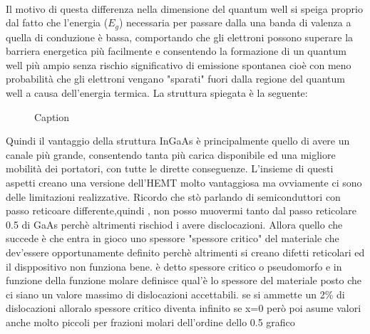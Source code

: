 \\%
Il motivo di questa differenza nella dimensione del quantum well si speiga proprio dal fatto che l'energia ($E_g$) necessaria per passare dalla una banda di valenza a quella di conduzione è bassa, comportando che gli elettroni possono superare la barriera energetica più facilmente e consentendo la formazione di un quantum well più ampio senza rischio significativo di emissione spontanea cioè con meno probabilità che gli elettroni vengano "sparati" fuori dalla regione del quantum well a causa dell'energia termica.
La struttura spiegata è la seguente:

\begin{figure}[hbt!]
    \centering
    \caption{Caption}%
    \label{fig:enter-label}
\end{figure}

Quindi il vantaggio della struttura InGaAs è principalmente quello di avere un canale più grande, consentendo tanta più carica disponibile ed una migliore mobilità dei portatori, con tutte le dirette conseguenze.
L'insieme di questi aspetti creano una versione dell'HEMT molto vantaggiosa ma ovviamente ci sono delle limitazioni realizzative. Ricordo che stò parlando di semiconduttori con passo reticoare differente,quindi , non posso muovermi tanto dal passo reticolare 0.5 di GaAs perchè altrimenti rischiod i avere disclocazioni.
Allora quello che succede è che entra in gioco uno spessore "spessore critico" del materiale che dev'essere opportunamente definito perchè altrimenti si creano difetti reticolari ed il disppositivo non funziona bene.
è detto spessore critico o pseudomorfo e in funzione della funzione molare definisce qual'è lo spessore del materiale posto che ci siano un valore massimo di dislocazioni accettabili.
se si ammette un 2\% di dislocazioni alloralo spessore critico diventa infinito se x=0 però poi asume valori anche molto piccoli per frazioni molari dell'ordine dello 0.5
grafico\\

